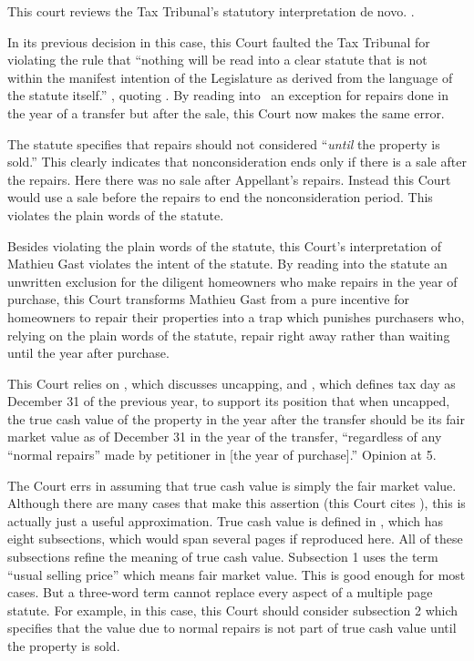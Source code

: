 \documentclass[12pt,\documentclassflag]{michiganCourtOfAppealsBrief}
\begin{document}
This court reviews the Tax Tribunal's statutory interpretation de novo. .

In its previous decision in this case, this Court faulted the Tax Tribunal for violating the rule that ``nothing will be read into a clear statute that is not within the manifest intention of the Legislature as derived from the language of the statute itself.'' , quoting . By reading into \mathieuGast\ an exception for repairs done in the year of a transfer but after the sale, this Court now makes the same error.

The statute specifies that repairs should not considered ``\emph{until} the property is sold.'' This clearly indicates that nonconsideration ends only if there is a sale after the repairs. Here there was no sale after Appellant's repairs. Instead this Court would use a sale before the repairs to end the nonconsideration period. This violates the plain words of the statute.

Besides violating the plain words of the statute, this Court's interpretation of Mathieu Gast violates the intent of the statute.
By reading into the statute an unwritten exclusion for the diligent homeowners who make repairs in the year of purchase, this Court transforms Mathieu Gast from a pure incentive for homeowners to repair their properties into a trap which punishes purchasers who, relying on the plain words of the statute, repair right away rather than waiting until the year after purchase.

This Court relies on \cite[s]{MCL 211.27a(3)}, which discusses uncapping, and \cite[s]{MCL 211.2(2)}, which defines tax day as December 31 of the previous year, to support its position that when uncapped, the true cash value of the property in the year after the transfer should be its fair market value as of December 31 in the year of the transfer, ``regardless of any ``normal repairs'' made by petitioner in [the year of purchase].'' 
Opinion at 5.

The Court errs in assuming that true cash value is simply the fair market value. Although there are many cases that make this assertion (this Court cites ), this is actually just a useful approximation. True cash value is defined in \cite{MCL 211.27}, which has eight subsections, which would span several pages if reproduced here. All of these subsections refine the meaning of true cash value. Subsection 1 uses the term ``usual selling price'' which means fair market value. This is good enough for most cases. But a three-word term cannot replace every aspect of a multiple page statute. For example, in this case, this Court should consider subsection 2 which specifies that the value due to normal repairs is not part of true cash value until the property is sold.
\end{document}

